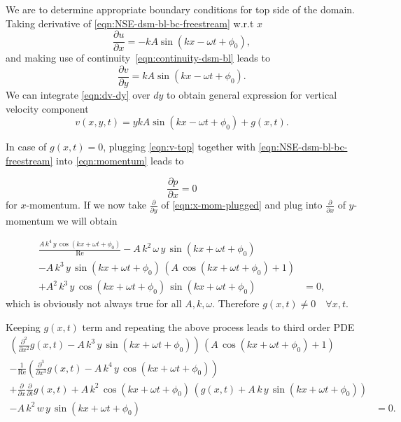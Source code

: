 \documentclass{article}
\numberwithin{equation}{section}
\begin{document}
We are to determine appropriate boundary conditions for top side of the domain. 
Taking derivative of \cref{eqn:NSE-dsm-bl-bc-freestream} w.r.t $x$
\begin{equation}
	\frac{\partial u}{\partial x} = -kA\sin\left( kx -\omega t + \phi_0  \right),
\end{equation}
and making use of continuity~\cref{eqn:continuity-dsm-bl} leads to
\begin{equation}\label{eqn:dv-dy}
	\frac{\partial v}{\partial y} = kA\sin\left( kx -\omega t + \phi_0  \right).
\end{equation}
We can integrate \cref{eqn:dv-dy} over $d y$ to obtain general expression for vertical velocity component 
\begin{equation}\label{eqn:v-top}
	v(x,y,t)= ykA\sin\left( kx -\omega t + \phi_0   \right)+g(x,t).
\end{equation}

In case of $g(x,t)=0$, plugging \cref{eqn:v-top} together with \cref{eqn:NSE-dsm-bl-bc-freestream} into \cref{eqn:momentum} leads to 

\begin{equation}\label{eqn:x-mom-plugged}
	\frac{\partial p}{\partial x} = 0
\end{equation}
for $x$-momentum. If we now take $\frac{\partial }{\partial y}$ of \cref{eqn:x-mom-plugged} and plug into $\frac{\partial}{\partial x}$ of $y$-momentum we will obtain  

\begin{equation}
\begin{aligned}
	\frac{A\,k^4\,y\,\cos\left(k x+\omega t + \phi_0 \right)}{\mathrm{Re}}-A\,k^2\,\omega\,y\,\sin\left(k x+\omega t + \phi_0 \right)&
	\\-A\,k^3\,y\,\sin\left(k x+\omega t + \phi_0 \right)\,\left(A\,\cos\left(k x+\omega t + \phi_0 \right)+1\right)&
	\\+A^2\,k^3\,y\,\cos\left(k x+\omega t + \phi_0 \right)\,\sin\left(k x+\omega t + \phi_0 \right)&=0,
\end{aligned}
\end{equation}
which is obviously not always true for all $A,k,\omega$. Therefore $g(x,t)\neq0 \quad \forall x,t$.

Keeping $g(x,t)$ term and repeating the above process leads to third order PDE
\begin{equation}\begin{aligned}\label{eqn:g-third}
	\left(\frac{\partial ^2}{\partial x^2} g\left(x,t\right)-A\,k^3\,y\,\sin\left(k x+\omega t + \phi_0 \right)\right)\,\left(A\,\cos\left(k x+\omega t + \phi_0 \right)+1\right)&
	\\-\frac{1}{\mathrm{Re}}\left( \frac{\partial ^3}{\partial x^3} g\left(x,t\right)-A\,k^4\,y\,\cos\left(k x+\omega t + \phi_0 \right)\right)&
	\\+\frac{\partial }{\partial x} \frac{\partial }{\partial t} g\left(x,t\right)+A\,k^2\,\cos\left(k x+\omega t + \phi_0 \right)\,\left(g\left(x,t\right)+A\,k\,y\,\sin\left(k x+\omega t + \phi_0 \right)\right)&
	\\-A\,k^2\,w\,y\,\sin\left(k x+\omega t + \phi_0 \right)&=0.
\end{aligned}
\end{equation}
\end{document}
